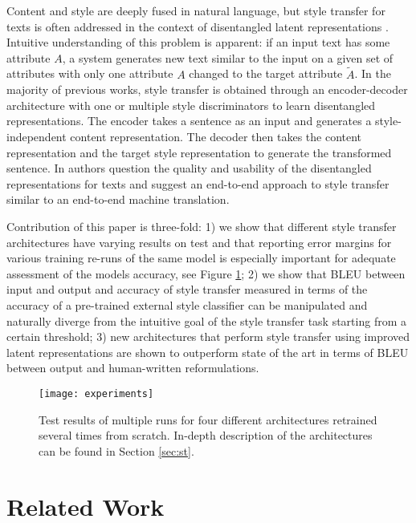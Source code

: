 \documentclass[11pt,a4paper]{article}
\begin{document}
Content and style are deeply fused in natural language, but style transfer for texts is often addressed in the context of disentangled latent representations \cite{hylsx, Shen, fu2, john18, romanov18, tian18}. Intuitive understanding of this problem is apparent: if an input text has some attribute $A$, a system generates new text similar to the input on a given set of attributes with only one attribute $A$ changed to the target attribute $\tilde{A}$. In the majority of previous works, style transfer is obtained through an encoder-decoder architecture with one or multiple style discriminators to learn disentangled representations. The encoder takes a sentence as an input and generates a style-independent content representation. The decoder then takes the content representation and the target style representation to generate the transformed sentence. In \cite{subramanian18} authors question the quality and usability of the disentangled representations for texts and suggest an end-to-end approach to style transfer similar to an end-to-end machine translation. 

Contribution of this paper is three-fold: 1) we show that different style transfer architectures have varying results on test and that reporting error margins for various training re-runs of the same model is especially important for adequate assessment of the models accuracy, see Figure \ref{pic:ex}; 2) we show that BLEU \cite{Papineni} between input and output and accuracy of style transfer measured in terms of the accuracy of a pre-trained external style classifier can be manipulated and naturally diverge from the intuitive goal of the style transfer task starting from a certain threshold; 3) new architectures that perform style transfer using improved latent representations are shown to outperform state of the art in terms of BLEU between output and human-written reformulations.

\begin{figure}[ht]
\begin{center}
\centerline{\texttt{[image: experiments]}}
\caption{Test results of multiple runs for four different architectures retrained several times from scratch. In-depth description of the architectures can be found in Section \ref{sec:st}.}
\label{pic:ex}
\end{center}
\end{figure}

\section{Related Work}
\label{sec:rw}
 
\end{document}
